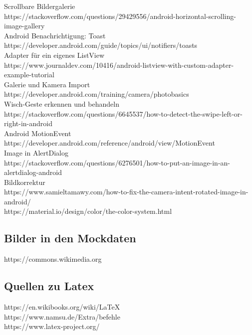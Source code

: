 Scrollbare Bildergalerie\\
https://stackoverflow.com/questions/29429556/android-horizontal-scrolling-image-gallery\\
Android Benachrichtigung: Toast\\
https://developer.android.com/guide/topics/ui/notifiers/toasts\\
Adapter für ein eigenes ListView\\
https://www.journaldev.com/10416/android-listview-with-custom-adapter-example-tutorial\\
Galerie und Kamera Import\\
https://developer.android.com/training/camera/photobasics\\
Wisch-Geste erkennen und behandeln\\
https://stackoverflow.com/questions/6645537/how-to-detect-the-swipe-left-or-right-in-android\\
Android MotionEvent\\
https://developer.android.com/reference/android/view/MotionEvent\\
Image in AlertDialog\\
https://stackoverflow.com/questions/6276501/how-to-put-an-image-in-an-alertdialog-android\\
Bildkorrektur\\
https://www.samieltamawy.com/how-to-fix-the-camera-intent-rotated-image-in-android/\\

https://material.io/design/color/the-color-system.html\\

\subsection{Bilder in den Mockdaten}
https://commons.wikimedia.org


\subsection{Quellen zu Latex}

https://en.wikibooks.org/wiki/LaTeX\\
https://www.namsu.de/Extra/befehle\\
https://www.latex-project.org/\\


